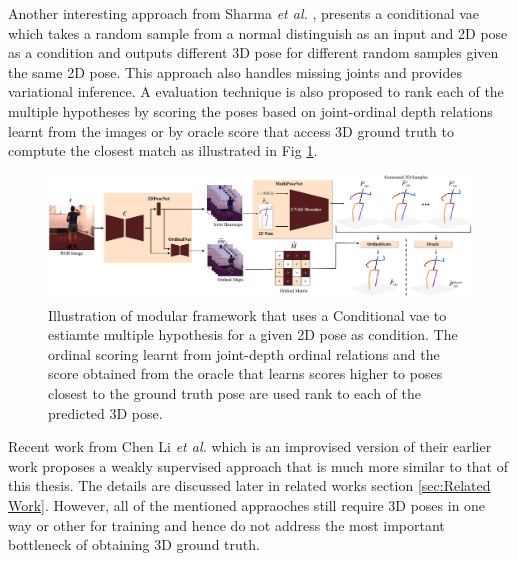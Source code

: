 Another interesting approach from Sharma \textit{et al.} \cite{ordinalranking}, presents a conditional \acl{vae} which takes a random sample from a normal distinguish as an input and 2D pose as a condition and outputs different 3D pose for different random samples given the same 2D pose. This approach also handles missing joints and provides variational inference. A evaluation technique is also proposed to rank each of the multiple hypotheses by scoring the poses based on joint-ordinal depth relations learnt from the images or by oracle score that access 3D ground truth to comptute the closest match as illustrated in Fig \ref{fig:ordinal_arch}.

\begin{figure}[!h]
    \centering
    \includegraphics[width=\linewidth]{figures/background/ordinal_arch.pdf}
    \caption{Illustration of modular framework that uses a Conditional \ac{vae} to estiamte multiple hypothesis for a given 2D pose as condition. The ordinal scoring learnt from joint-depth ordinal relations and the score obtained from the oracle that learns scores higher to poses closest to the ground truth pose are used rank to each of the predicted 3D pose.}
    \label{fig:ordinal_arch}
\end{figure}

Recent work from Chen Li \textit{et al.} \cite{weaklymultiple} which is an improvised version of their earlier work \cite{multiplehypo} proposes a weakly supervised approach that is much more similar to that of this thesis. The details are discussed later in related works section \ref{sec:Related Work}. However, all of the mentioned appraoches still require 3D poses in one way or other for training and hence do not address the most important bottleneck of obtaining 3D ground truth. 

